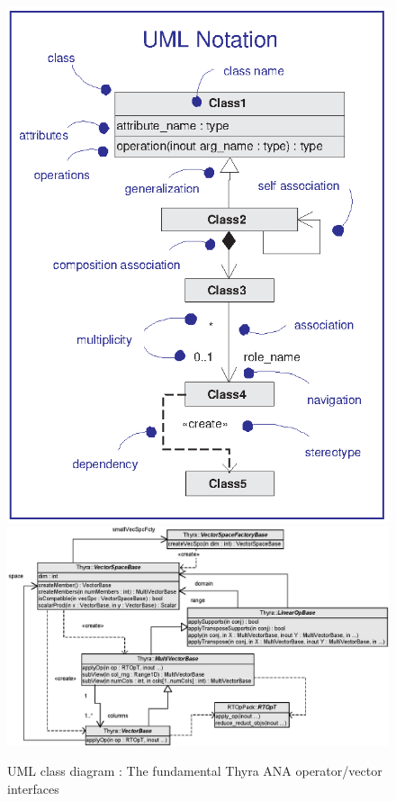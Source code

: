 \documentclass[pdf,ps2pdf,11pt]{SANDreport}
\begin{document}
{\bsinglespace
\begin{figure}[p]
\begin{center}
\includegraphics*[bb= 0.0in 0.0in 3.3in 4.4in,scale=0.40
]{UML1}
\includegraphics*[scale=0.65]{ThyraOperatorVector}
\end{center}
\caption{
\label{thyra:fig:basic_op_vec_itfc}
UML class diagram : The fundamental Thyra ANA operator/vector interfaces }
\end{figure}
\esinglespace}
\end{document}
